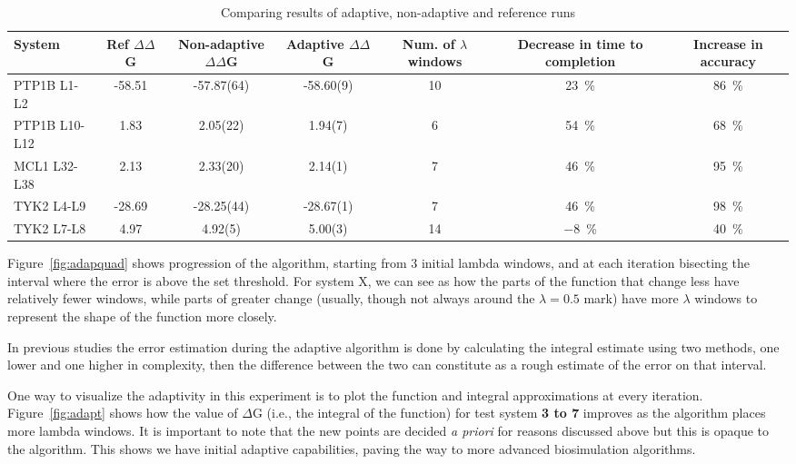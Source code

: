 \begin{table}
  \caption{Comparing results of adaptive, non-adaptive and reference runs}
  \label{tab:adapquad}
  \begin{tabular}{lSSSSSS}
    \toprule
    {System}                               & 
    {Ref $\Delta \Delta$G}                 &
    {Non-adaptive $\Delta \Delta$G}        &
    {Adaptive $\Delta \Delta$G}            &
    {Num. of $\lambda$ windows}            &
    {Decrease in time to completion}       &
    {Increase in accuracy}                 \\
    \midrule
    {PTP1B L1-L2}   & 
    -58.51 & 
    -57.87(64) & 
    -58.60(9) & 
    10 & 
    \SI{23}{\percent} & 
    \SI{86}{\percent} \\
    {PTP1B L10-L12} & 
    1.83   & 
    2.05(22) & 
    1.94(7)  & 
    6  & 
    \SI{54}{\percent} &
    \SI{68}{\percent} \\
    {MCL1  L32-L38} & 
    2.13   & 
    2.33(20) & 
    2.14(1)      & 
    7  & 
    \SI{46}{\percent} & 
    \SI{95}{\percent} \\
    {TYK2  L4-L9}   &
    -28.69 & 
    -28.25(44) & 
    -28.67(1)  & 
    7  & 
    \SI{46}{\percent} & 
    \SI{98}{\percent} \\
    {TYK2  L7-L8}   & 
    4.97   & 
    4.92(5) & 
    5.00(3)      & 
    14 &  
    \SI{-8}{\percent} & 
    \SI{40}{\percent} \\
    \bottomrule 
    
  \end{tabular}
\end{table}

Figure~\ref{fig:adapquad} shows progression of the algorithm, starting from  
3 initial lambda windows, and at each iteration bisecting the interval where 
the error is above the set threshold. For system X, we can see as how the parts 
of the function that change less have relatively fewer windows, while parts of 
greater change (usually, though not always around the $\lambda=0.5$ mark) have 
more $\lambda$ windows to represent the shape of the function more closely. 

 In previous studies \cite{} the 
error estimation during the adaptive algorithm is done by calculating the 
integral estimate using two methods, one lower and one higher in complexity, 
then the difference between the two can constitute as a rough estimate of the 
error on that interval.


One way to visualize the adaptivity in this experiment is to plot the
function and integral approximations at every iteration.
Figure~\ref{fig:adapt} shows how the value of $\Delta$G (i.e., the integral
of the function) for test system \textbf{3 to 7}  improves as the
algorithm places more lambda windows. It is important to note that the new
points are decided {\it a priori} for reasons discussed above but this is
opaque to the algorithm. This shows we have initial adaptive capabilities,
paving the way to more advanced biosimulation algorithms.

